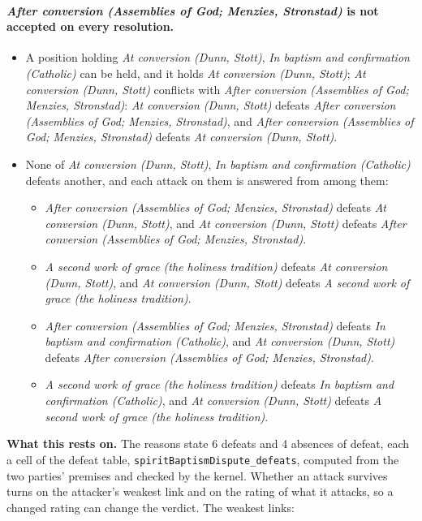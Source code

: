 \documentclass[11pt]{article}
\begin{document}
\paragraph{\emph{After conversion (Assemblies of God; Menzies, Stronstad)} is not accepted on every resolution.}
\begin{itemize}
\item A position holding \emph{At conversion (Dunn, Stott)}, \emph{In baptism and confirmation (Catholic)} can be held, and it holds \emph{At conversion (Dunn, Stott)}; \emph{At conversion (Dunn, Stott)} conflicts with \emph{After conversion (Assemblies of God; Menzies, Stronstad)}: \emph{At conversion (Dunn, Stott)} defeats \emph{After conversion (Assemblies of God; Menzies, Stronstad)}, and \emph{After conversion (Assemblies of God; Menzies, Stronstad)} defeats \emph{At conversion (Dunn, Stott)}.
\item None of \emph{At conversion (Dunn, Stott)}, \emph{In baptism and confirmation (Catholic)} defeats another, and each attack on them is answered from among them:
\begin{itemize}
\item \emph{After conversion (Assemblies of God; Menzies, Stronstad)} defeats \emph{At conversion (Dunn, Stott)}, and \emph{At conversion (Dunn, Stott)} defeats \emph{After conversion (Assemblies of God; Menzies, Stronstad)}.
\item \emph{A second work of grace (the holiness tradition)} defeats \emph{At conversion (Dunn, Stott)}, and \emph{At conversion (Dunn, Stott)} defeats \emph{A second work of grace (the holiness tradition)}.
\item \emph{After conversion (Assemblies of God; Menzies, Stronstad)} defeats \emph{In baptism and confirmation (Catholic)}, and \emph{At conversion (Dunn, Stott)} defeats \emph{After conversion (Assemblies of God; Menzies, Stronstad)}.
\item \emph{A second work of grace (the holiness tradition)} defeats \emph{In baptism and confirmation (Catholic)}, and \emph{At conversion (Dunn, Stott)} defeats \emph{A second work of grace (the holiness tradition)}.
\end{itemize}
\end{itemize}
\par\noindent\textbf{What this rests on.} The reasons state 6 defeats and 4 absences of defeat, each a cell of the defeat table, \texttt{spirit\allowbreak{}Baptism\allowbreak{}Dispute\_\allowbreak{}defeats}, computed from the two parties' premises and checked by the kernel. Whether an attack survives turns on the attacker's weakest link and on the rating of what it attacks, so a changed rating can change the verdict. The weakest links:
\end{document}
